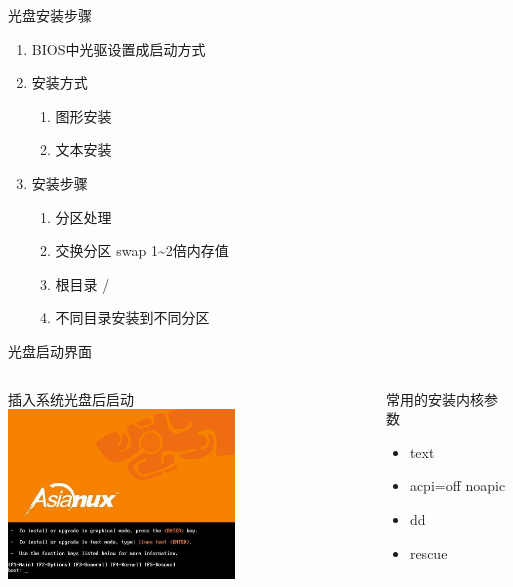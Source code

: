 \begin{frame}{光盘安装步骤}
\begin{enumerate}
\item BIOS中光驱设置成启动方式
\item 安装方式
	
	\begin{enumerate}
	\item 图形安装
	\item 文本安装
	\end{enumerate}
\item 安装步骤

	\begin{enumerate}
	\item 分区处理
	\item 交换分区 swap 1\textasciitilde{}2倍内存值
	\item 根目录 /
	\item 不同目录安装到不同分区
	\end{enumerate}
\end{enumerate}

\end{frame}


\begin{frame}{光盘启动界面}

\begin{columns}[t]
	\begin{exampleblock}{插入系统光盘后启动}
	\includegraphics[width=6cm]{images/axs3-install/boot}
	\end{exampleblock}
	
	\pause
		\begin{exampleblock}{常用的安装内核参数}
			\begin{itemize}
			\item text
			\item acpi=off noapic
			\item dd
			\item rescue
			\end{itemize}
    \end{exampleblock}
\end{columns}
\end{frame}


